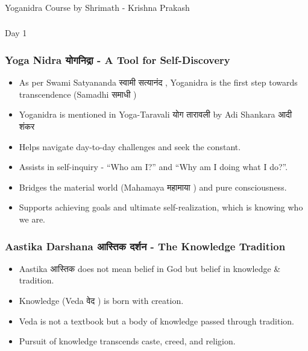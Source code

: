 \begin{frame}[fragile]\frametitle{}
\begin{center}
{\Large Yoganidra Course by Shrimath  -  Krishna Prakash}
\end{center}
\end{frame}

\begin{frame}[fragile]\frametitle{}
\begin{center}
{\Large Day 1}
\end{center}
\end{frame}

\begin{frame}[fragile]\frametitle{Yoga Nidra  योगनिद्रा  -  A Tool for Self-Discovery}
      \begin{itemize}
        \item As per Swami Satyananda स्वामी सत्यानंद , Yoganidra is the first step towards transcendence (Samadhi समाधी )
		\item Yoganidra is mentioned in Yoga-Taravali योग तारावली  by Adi Shankara आदी शंकर 	  
        \item Helps navigate day-to-day challenges and seek the constant.
        \item Assists in self-inquiry - ``Who am I?'' and ``Why am I doing what I do?''.
        \item Bridges the material world (Mahamaya महामाया ) and pure consciousness.
        \item Supports achieving goals and ultimate self-realization, which is knowing who we are.
      \end{itemize}
\end{frame}

\begin{frame}[fragile]\frametitle{Aastika Darshana आस्तिक दर्शन  - The Knowledge Tradition}
      \begin{itemize}
        \item Aastika आस्तिक does not mean belief in God but belief in knowledge \& tradition.
        \item Knowledge (Veda वेद ) is born with creation.
        \item Veda is not a textbook but a body of knowledge passed through tradition.
        \item Pursuit of knowledge transcends caste, creed, and religion.
      \end{itemize}
\end{frame}

